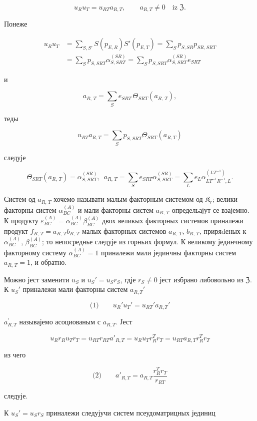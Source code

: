 \documentclass[11pt]{article}
\begin{document}
\[
u_Ru_T=u_{RT}a_{R,T},\qquad a_{R,T}\ne0\quad\text{iz }\mathfrak Z.
\]

Понеже

\[
\begin{aligned}
u_Ru_T
&=\sum_{S,S'} S(p_{E,R})S'(p_{E,T})
=\sum_S p_{S,SR}p_{SR,SRT}\\
&=\sum_S p_{S,SRT}\alpha_{S,SRT}^{(SR)}
=\sum_S p_{S,SRT}\alpha_{S,SRT}^{(SR)}e_{SRT}
\end{aligned}
\]

и

\[a_{R,\,T} = \sum\limits_{S} e_{SRT}\, \Theta_{SRT} \left(a_{R,\,T}\right),\]

теды

\[u_{RT} a_{R,T} = \sum\limits_{S} p_{S,SRT} \Theta_{SRT} (a_{R,T})\]

следује

\[\Theta_{SRT}(a_{R,\,T}) = \alpha_{S,SRT}^{(SR)}, ~~ a_{R,\,T} = \sum\limits_{S} e_{SRT} \alpha_{S,SRT}^{(SR)} = \sum\limits_{L} e_{L} \alpha_{LT^{-1}R^{-1},L}^{(LT^{-1})}.\]

Систем од \(a_{R,\,T}\) хочемо называти малым факторным системом од \(\mathfrak K_r\); велики факторны систем \(\alpha_{BC}^{(A)}\) и мали факторны систем \(a_{R,\,T}\) определьајут се взајемно. К продукту \(\varepsilon_{BC}^{(A)} = \alpha_{BC}^{(A)} \beta_{BC}^{(A)}\) двох великых факторных системов приналежи продукт \(f_{R,\,T} = a_{R,\,T}b_{R,\,T}\) малых факторных системов \(a_{R,\,T}\), \(b_{R,\,T}\), приряđеных к \(\alpha_{BC}^{(A)}\), \(\beta_{BC}^{(A)}\); то непосреднье следује из горньих формул. К великому јединчному факторному систему \(\alpha_{BC}^{(A)} = 1\) приналежи мали јединчны факторны систем \(a_{R,\,T} = 1\), и обратно.

Можно јест заменити \(u_S\) и \(u_S'=u_Sr_S\), гдје \(r_S\neq 0\) јест избрано либовольно из \(\mathfrak Z\). К \(u_S'\) приналежи мали факторны систем \(a_{R,T}'\)

\[
\text{(1)}\qquad u_R'u_T'=u_{RT}'a_{R,T}'
\]

\(a_{R,T}^{\prime}\) называјемо асоциованым с \(a_{R,T}\). Јест

\[u_R r_R u_T r_T = u_{RT} r_{RT} a'_{R,T} = u_R u_T r_R^T r_T = u_{RT} a_{R,T} r_R^T r_T\]

из чего

\[
\text{(2)}\qquad a'_{R,T}=a_{R,T}\frac{r_R^T r_T}{r_{RT}}
\]

следује.

К \(u_S' = u_S r_S\) приналежи следујучи систем псеудоматрицных јединиц
\end{document}
